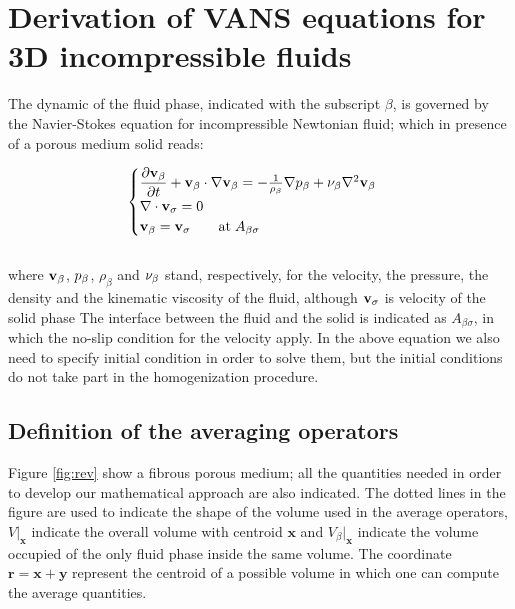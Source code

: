 \section{Derivation of VANS equations for 3D incompressible fluids}
The dynamic of the fluid phase, indicated with the subscript $\beta$, is governed by the Navier-Stokes equation for incompressible Newtonian fluid; which in presence of a porous medium solid reads:

\begin{eqnarray}
	\begin{cases}
		\dfrac{\partial \textbf{v}_{\beta}}{\partial t} + \textbf{v}_{\beta} \cdot \nabla \textbf{v}_{\beta} = -\frac{1}{\rho_{\beta}} \nabla p_{\beta} + \nu_{\beta} \nabla^2  \textbf{v}_{\beta}  \\
		\nabla \cdot \textbf{v}_{\sigma} = 0 \\
		\textbf{v}_{\beta} = \textbf{v}_{\sigma} \qquad \text{at} \; A_{\beta\sigma}
	\end{cases}
\label{eq:NS}
\end{eqnarray}\\

where $\textbf{v}_{\beta}$, $p_{\beta}$, $\rho_{\beta}$ and $\nu_{\beta}$ stand, respectively, for  the velocity, the pressure, the density and the kinematic viscosity of the fluid, although  $\textbf{v}_{\sigma}$ is velocity of the solid phase
The interface between the fluid and the solid is indicated as $A_{\beta\sigma}$, in which the no-slip condition for the velocity apply.
In the above equation we also need to specify initial condition in order to solve them, but the initial conditions do not take part in the homogenization procedure.

\subsection{Definition of the averaging operators}



Figure \ref{fig:rev} show a fibrous porous medium; all the quantities needed in order to develop our mathematical approach are also indicated.
The dotted lines in the figure are used to indicate the shape of the volume used in the average operators, $V|_{\mathbf{x}}$ indicate the overall volume with centroid $\mathbf{x}$ and $V_{\beta}|_{\mathbf{x}}$ indicate the volume occupied of the only fluid phase inside the same volume.
The coordinate $\mathbf{r} = \mathbf{x} +\mathbf{y}$ represent the centroid of a possible volume in which one can compute the average quantities.

